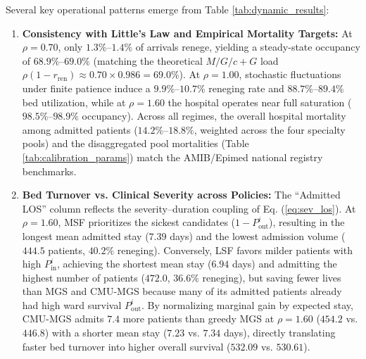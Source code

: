 \documentclass[final,5p,times,twocolumn]{elsarticle}
\begin{document}
Several key operational patterns emerge from Table \ref{tab:dynamic_results}:
\begin{enumerate}[(1)]
    \item \textbf{Consistency with Little's Law and Empirical Mortality Targets:} At $\rho = 0.70$, only $1.3\%$--$1.4\%$ of arrivals renege, yielding a steady-state occupancy of $68.9\%$--$69.0\%$ (matching the theoretical $M/G/c+G$ load $\rho (1 - r_{\text{ren}}) \approx 0.70 \times 0.986 = 69.0\%$). At $\rho = 1.00$, stochastic fluctuations under finite patience induce a $9.9\%$--$10.7\%$ reneging rate and $88.7\%$--$89.4\%$ bed utilization, while at $\rho = 1.60$ the hospital operates near full saturation ($98.5\%$--$98.9\%$ occupancy). Across all regimes, the overall hospital mortality among admitted patients ($14.2\%$--$18.8\%$, weighted across the four specialty pools) and the disaggregated pool mortalities (Table \ref{tab:calibration_params}) match the AMIB/Epimed national registry benchmarks.
    \item \textbf{Bed Turnover vs. Clinical Severity across Policies:} The ``Admitted LOS'' column reflects the severity--duration coupling of Eq. (\ref{eq:sev_los}). At $\rho = 1.60$, MSF prioritizes the sickest candidates ($1 - P_{\text{out}}^i$), resulting in the longest mean admitted stay ($7.39$ days) and the lowest admission volume ($444.5$ patients, $40.2\%$ reneging). Conversely, LSF favors milder patients with high $P_{\text{in}}^i$, achieving the shortest mean stay ($6.94$ days) and admitting the highest number of patients ($472.0$, $36.6\%$ reneging), but saving fewer lives than MGS and CMU-MGS because many of its admitted patients already had high ward survival $P_{\text{out}}^i$. By normalizing marginal gain by expected stay, CMU-MGS admits $7.4$ more patients than greedy MGS at $\rho = 1.60$ ($454.2$ vs. $446.8$) with a shorter mean stay ($7.23$ vs. $7.34$ days), directly translating faster bed turnover into higher overall survival ($532.09$ vs. $530.61$).

\end{enumerate}
\end{document}
